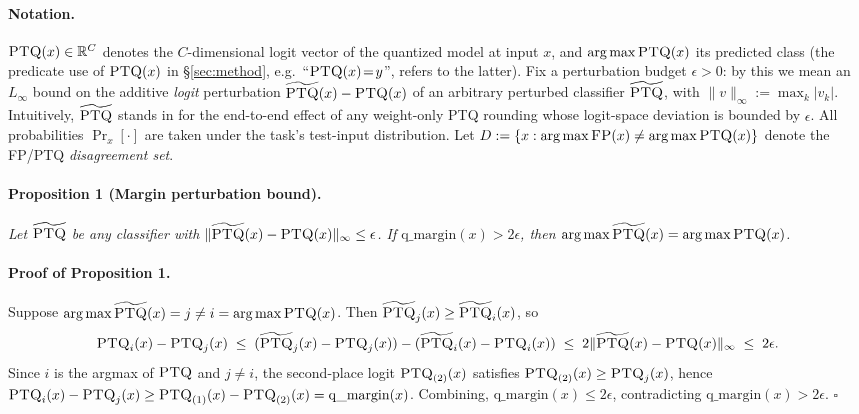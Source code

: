 \documentclass{article}
\newcommand{\fp}{\textsc{FP}\xspace}
\newcommand{\ptq}{\textsc{PTQ}\xspace}
\begin{document}
\paragraph{Notation.}
$\ptq(x) \in \mathbb R^C$ denotes the $C$-dimensional logit vector of the quantized model at input $x$, and $\arg\max\ptq(x)$ its predicted class (the predicate use of $\ptq(x)$ in \S\ref{sec:method}, e.g.\ ``$\ptq(x)\!=\!y$'', refers to the latter). Fix a perturbation budget $\epsilon > 0$: by this we mean an $L_\infty$ bound on the additive \emph{logit} perturbation $\widetilde{\ptq}(x) - \ptq(x)$ of an arbitrary perturbed classifier $\widetilde{\ptq}$, with $\|v\|_\infty := \max_k |v_k|$. Intuitively, $\widetilde{\ptq}$ stands in for the end-to-end effect of any weight-only \ptq{} rounding whose logit-space deviation is bounded by $\epsilon$. All probabilities $\Pr_x[\cdot]$ are taken under the task's test-input distribution. Let $D := \{x : \arg\max\fp(x) \neq \arg\max\ptq(x)\}$ denote the \fp{}/\ptq{} \emph{disagreement set}.

\paragraph{Proposition 1 (Margin perturbation bound).}
\emph{Let $\widetilde{\ptq}$ be any classifier with $\|\widetilde{\ptq}(x) - \ptq(x)\|_\infty \leq \epsilon$. If $\mathrm{q\_margin}(x) > 2\epsilon$, then $\arg\max\widetilde{\ptq}(x) = \arg\max\ptq(x)$.}

\paragraph{Proof of Proposition 1.}
Suppose $\arg\max\widetilde{\ptq}(x) = j \neq i = \arg\max\ptq(x)$. Then $\widetilde{\ptq}_j(x) \geq \widetilde{\ptq}_i(x)$, so
\[
\ptq_i(x) - \ptq_j(x) \;\leq\; (\widetilde{\ptq}_j(x) - \ptq_j(x)) - (\widetilde{\ptq}_i(x) - \ptq_i(x)) \;\leq\; 2\|\widetilde{\ptq}(x) - \ptq(x)\|_\infty \;\leq\; 2\epsilon.
\]
Since $i$ is the argmax of $\ptq$ and $j \neq i$, the second-place logit $\ptq_{(2)}(x)$ satisfies $\ptq_{(2)}(x) \geq \ptq_j(x)$, hence $\ptq_i(x) - \ptq_j(x) \geq \ptq_{(1)}(x) - \ptq_{(2)}(x) = \mathrm{q\_margin}(x)$. Combining, $\mathrm{q\_margin}(x) \leq 2\epsilon$, contradicting $\mathrm{q\_margin}(x) > 2\epsilon$. \hfill$\square$
\end{document}
